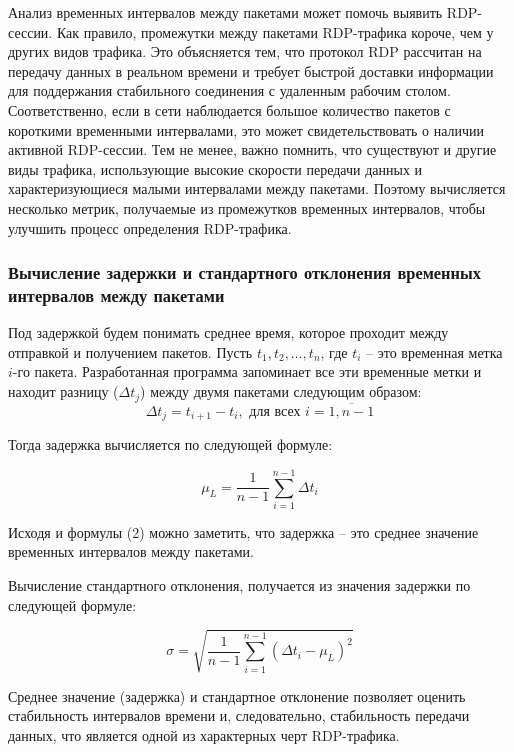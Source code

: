 \documentclass[bachelor, och, coursework]{SCWorks}
\begin{document}
Анализ временных интервалов между пакетами может помочь выявить RDP-сессии. Как правило, промежутки между пакетами RDP-трафика короче, 
чем у других видов трафика. Это объясняется тем, что протокол RDP рассчитан на передачу данных в реальном времени и требует быстрой 
доставки информации для поддержания стабильного соединения с удаленным рабочим столом. Соответственно, если в сети наблюдается 
большое количество пакетов с короткими временными интервалами, это может свидетельствовать о наличии активной RDP-сессии. Тем 
не менее, важно помнить, что существуют и другие виды трафика, использующие высокие скорости передачи данных и характеризующиеся 
малыми интервалами между пакетами. Поэтому вычисляется несколько метрик, получаемые из промежутков временных интервалов, чтобы улучшить
процесс определения RDP-трафика.

\subsubsection{Вычисление задержки и стандартного отклонения временных интервалов между пакетами}

Под задержкой будем понимать среднее время, которое проходит между отправкой и получением пакетов. Пусть $ t_1, t_2, \dots, t_n $, 
где $ t_i $ -- это временная метка $ i $-го пакета. Разработанная программа запоминает все эти временные метки и находит разницу ($\Delta t_j$) 
между двумя пакетами следующим образом:
\begin{equation}
  \Delta t_j = t_{i+1} - t_{i}, \text{ для всех } i = \overline{1, n - 1}
\end{equation}

Тогда задержка вычисляется по следующей формуле:

\begin{equation}
  \mu_L = \frac{1}{n - 1} \sum_{i=1}^{n-1} \Delta t_i
\end{equation}

Исходя и формулы (2) можно заметить, что задержка -- это среднее значение временных интервалов между пакетами.

Вычисление стандартного отклонения, получается из значения задержки по следующей формуле:

\begin{equation}
  \sigma = \sqrt{\frac{1}{n-1} \sum_{i=1}^{n-1} (\Delta t_i - \mu_L)^2}
\end{equation}

  Среднее значение (задержка) и стандартное отклонение позволяет оценить стабильность интервалов времени 
  и, следовательно, стабильность передачи данных, что является одной из характерных черт RDP-трафика.
\end{document}
